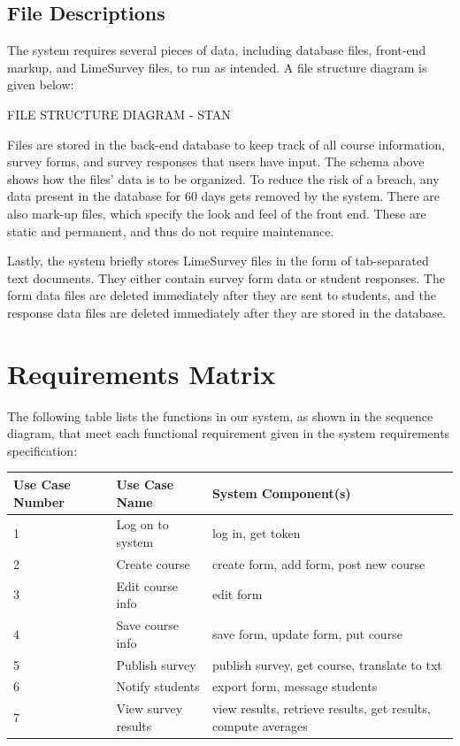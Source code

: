\documentclass{article}
\begin{document}
\subsection{File Descriptions}

The system requires several pieces of data, including database files, front-end markup, and LimeSurvey files, to run as intended. A file structure diagram is given below:

FILE STRUCTURE DIAGRAM - STAN

Files are stored in the back-end database to keep track of all course information, survey forms, and survey responses that users have input. The schema above shows how the files' data is to be organized. To reduce the risk of a breach, any data present in the database for 60 days gets removed by the system. There are also mark-up files, which specify the look and feel of the front end. These are static and permanent, and thus do not require maintenance.

Lastly, the system briefly stores LimeSurvey files in the form of tab-separated text documents. They either contain survey form data or student responses. The form data files are deleted immediately after they are sent to students, and the response data files are deleted immediately after they are stored in the database.

\section{Requirements Matrix}

The following table lists the functions in our system, as shown in the sequence diagram, that meet each functional requirement given in the system requirements specification:

\begin{center}
\begin{tabular}{|p{3.2cm}|p{3.2cm}|p{6cm}|} 
\hline
\textbf{Use Case Number} & \textbf{Use Case Name} & \textbf{System Component(s)} \\
\hline
1 & Log on to system & log in, get token\\ 
\hline
2 & Create course & create form, add form, post new course\\ 
\hline
3 & Edit course info & edit form\\ 
\hline
4 & Save course info & save form, update form, put course\\ 
\hline
5 & Publish survey & publish survey, get course, translate to txt\\ 
\hline
6 & Notify students & export form, message students\\ 
\hline
7 & View survey results & view results, retrieve results, get results, compute averages\\ 
\hline
\end{tabular}
\end{center}
\end{document}
